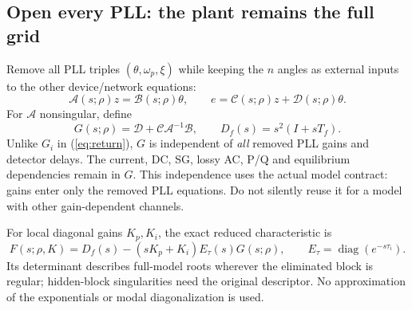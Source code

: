 \documentclass[11pt]{article}
\newcommand{\diag}{\operatorname{diag}}
\begin{document}
\subsection{Open every PLL: the plant remains the full grid}
Remove all PLL triples $(\theta,\omega_p,\xi)$ while keeping the $n$
angles as external inputs to the other device/network equations:
\[
 \mathcal A(s;\rho)z=\mathcal B(s;\rho)\theta,\qquad
 e=\mathcal C(s;\rho)z+\mathcal D(s;\rho)\theta .
\]
For $\mathcal A$ nonsingular, define
\begin{equation}
 G(s;\rho)=\mathcal D+\mathcal C\mathcal A^{-1}\mathcal B,
 \qquad D_f(s)=s^2(I+sT_f). \label{eq:allreturn}
\end{equation}
Unlike $G_i$ in (\ref{eq:return}), $G$ is independent of \emph{all}
removed PLL gains and detector delays. The current, DC, SG, lossy AC,
P/Q and equilibrium dependencies remain in $G$. This independence uses
the actual model contract: gains enter only the removed PLL equations.
Do not silently reuse it for a model with other gain-dependent channels.

For local diagonal gains $K_p,K_i$, the exact reduced characteristic is
\begin{equation}
 F(s;\rho,K)=D_f(s)-(sK_p+K_i)E_\tau(s)G(s;\rho),
 \qquad E_\tau=\diag(e^{-s\tau_i}). \label{eq:allF}
\end{equation}
Its determinant describes full-model roots wherever the eliminated
block is regular; hidden-block singularities need the original descriptor.
No approximation of the exponentials or modal diagonalization is used.
\end{document}
